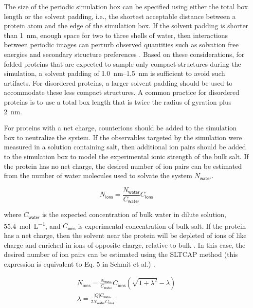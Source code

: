 \documentclass[9pt,review]{livecoms}
\begin{document}
The size of the periodic simulation box can be specified using either the total box length or the solvent padding, i.e., the shortest acceptable distance between a protein atom and the edge of the simulation box.
If the solvent padding is shorter than \qty{1}{\nano\meter}, enough space for two to three shells of water, then interactions between periodic images can perturb observed quantities such as solvation free energies and secondary structure preferences 
\cite{mehra_cell_2019,gapsys_importance_2020}.
Based on these considerations, for folded proteins that are expected to sample only compact structures during the simulation, a solvent padding of \qtyrange{1.0}{1.5}{\nano\meter} is sufficient to avoid such artifacts.
For disordered proteins, a larger solvent padding should be used to accommodate these less compact structures.
A common practice for disordered proteins is to use a total box length that is twice the radius of gyration plus \qty{2}{\nano\meter}.

For proteins with a net charge, counterions should be added to the simulation box to neutralize the system.
If the observables targeted by the simulation were measured in a solution containing salt, then additional ion pairs should be added to the simulation box to model the experimental ionic strength of the bulk salt.
If the protein has no net charge, the desired number of ion pairs can be estimated from the number of water molecules used to solvate the system $N_{\mathsf{water}}$.

\begin{equation}
\label{eqn:ions_neutral}
N_{\mathsf{ions}} = \frac {N_{\mathsf{water}}} {C_{\mathsf{water}}} C_{\mathsf{ions}}
\end{equation}

\noindent where $C_{\mathsf{water}}$ is the expected concentration of bulk water in dilute solution, \qty{55.4}{\mol\per\liter}, and $C_{\mathsf{ions}}$ is experimental concentration of bulk salt.
If the protein has a net charge, then the solvent near the protein will be depleted of ions of like charge and enriched in ions of opposite charge, relative to bulk \cite{schmit_sltcap_2018}.
In this case, the desired number of ion pairs can be estimated using the SLTCAP method (this expression is equivalent to Eq. 5 in Schmit et al.) \cite{schmit_sltcap_2018}.

\begin{equation}
\label{eqn:ions_charged}
\begin{gathered}
N_{\mathsf{ions}} = \frac {N_{\mathsf{water}}} {C_{\mathsf{water}}} C_{\mathsf{ions}} \left( \sqrt{1 + \lambda^2} - \lambda \right) \\
\lambda = \frac {\left| Q \right| C_{\mathsf{water}}} {2 N_{\mathsf{water}} C_{\mathsf{ions}}}
\end{gathered}
\end{equation}
\end{document}
